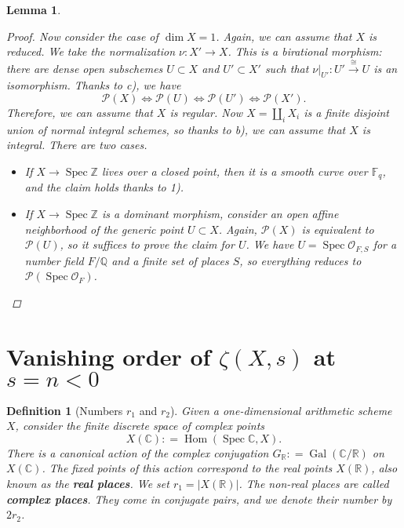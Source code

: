 \documentclass{article}
\DeclareMathOperator{\Gal}{Gal}
\DeclareMathOperator{\Hom}{Hom}
\DeclareMathOperator{\Spec}{Spec}
\newcommand{\CC}{\mathbb{C}}
\newcommand{\FF}{\mathbb{F}}
\newcommand{\QQ}{\mathbb{Q}}
\newcommand{\RR}{\mathbb{R}}
\newcommand{\ZZ}{\mathbb{Z}}
\newcommand{\dfn}{\mathrel{\mathop:}=}
\theoremstyle{myplain}
\newtheorem{lemma}[theorem]{Lemma}
\theoremstyle{mydefinition}
\newtheorem{definition}[theorem]{Definition}
\begin{document}
\begin{lemma}
\begin{proof}
    Now consider the case of $\dim X = 1$. Again, we can assume that $X$ is
    reduced. We take the normalization $\nu\colon X' \to X$. This is a
    birational morphism: there are dense open subschemes $U \subset X$ and
    $U' \subset X'$ such that
    $\left.\nu\right|_{U'}\colon U' \xrightarrow{\cong} U$ is an
    isomorphism. Thanks to c), we have
    \[ \mathcal{P} (X) \iff
      \mathcal{P} (U) \iff
      \mathcal{P} (U') \iff
      \mathcal{P} (X'). \]
    Therefore, we can assume that $X$ is regular. Now $X = \coprod_i X_i$ is a
    finite disjoint union of normal integral schemes, so thanks to b), we can
    assume that $X$ is integral. There are two cases.

    \begin{itemize}
    \item If $X \to \Spec \ZZ$ lives over a closed point, then it is a smooth
      curve over $\FF_q$, and the claim holds thanks to 1).

    \item If $X \to \Spec \ZZ$ is a dominant morphism, consider an open affine
      neighborhood of the generic point $U \subset X$. Again, $\mathcal{P} (X)$
      is equivalent to $\mathcal{P} (U)$, so it suffices to prove the claim for
      $U$. We have $U = \Spec \mathcal{O}_{F,S}$ for a number field $F/\QQ$ and
      a finite set of places $S$, so everything reduces to
      $\mathcal{P} (\Spec \mathcal{O}_F)$. \qedhere
    \end{itemize}
  \end{proof}
\end{lemma}


\section{Vanishing order of $\zeta (X,s)$ at $s = n < 0$}
\label{sec:vanishing-order}

\begin{definition}[Numbers $r_1$ and $r_2$]
  Given a one-dimensional arithmetic scheme $X$, consider the finite discrete
  space of complex points
  $$X(\CC) \dfn \Hom (\Spec \CC, X).$$
  There is a canonical action of the complex conjugation
  $G_\RR \dfn \Gal (\CC/\RR)$ on $X(\CC)$. The fixed points of this action
  correspond to the real points $X (\RR)$, also known as the
  \textbf{real places}. We set $r_1 = |X (\RR)|$. The non-real places are called
  \textbf{complex places}. They come in conjugate pairs, and we denote their
  number by $2 r_2$.
\end{definition}
\end{document}
